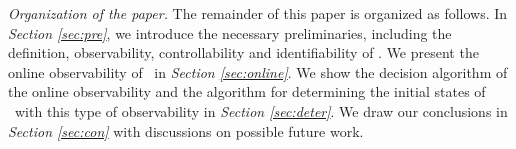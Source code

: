 






\smallskip\noindent
{\em Organization of the paper.}
The remainder of this paper is organized as follows.
 In {\em Section \ref{sec:pre}}, we  introduce the necessary preliminaries, including the definition, observability, controllability and identifiability of \BCNs. We present the  online  observability of \BCNs\ in {\em Section \ref{sec:online}}. We show  the  decision  algorithm of the online observability and the algorithm for determining the initial states of \BCNs\ with this type of observability in {\em Section \ref{sec:deter}}.  We draw our conclusions in  {\em Section \ref{sec:con}} with discussions on possible future work.

